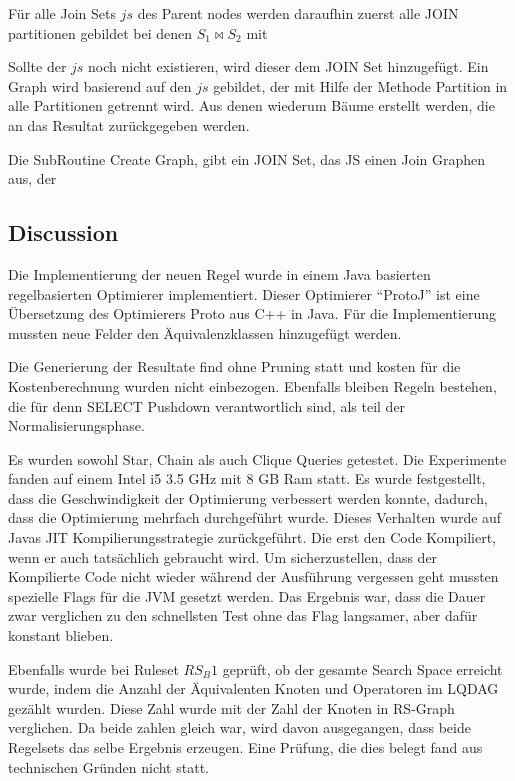 Für alle Join Sets $js$ des Parent nodes werden daraufhin zuerst alle JOIN partitionen gebildet bei denen $S_1 \Join S_2$ mit 

Sollte der $js$ noch nicht existieren, wird dieser dem JOIN Set hinzugefügt. Ein Graph wird basierend auf den $js$ gebildet, der mit Hilfe der Methode Partition in alle Partitionen getrennt wird. Aus denen wiederum Bäume erstellt werden, die an das Resultat zurückgegeben werden.

Die SubRoutine Create Graph, gibt ein JOIN Set, das JS einen Join Graphen aus, der




\subsection{Discussion}
Die Implementierung der neuen Regel wurde in einem Java basierten regelbasierten Optimierer implementiert. Dieser Optimierer “ProtoJ” ist eine Übersetzung des Optimierers Proto aus C++ in Java. Für die Implementierung mussten neue Felder den Äquivalenzklassen hinzugefügt werden.

Die Generierung der Resultate find ohne Pruning statt und kosten für die Kostenberechnung wurden nicht einbezogen. Ebenfalls bleiben Regeln bestehen, die für denn SELECT Pushdown verantwortlich sind, als teil der Normalisierungsphase. 

Es wurden sowohl Star, Chain als auch Clique Queries getestet. Die Experimente fanden auf einem Intel i5 3.5 GHz mit 8 GB Ram statt. Es wurde festgestellt, dass die Geschwindigkeit der Optimierung verbessert werden konnte, dadurch, dass die Optimierung mehrfach durchgeführt wurde. Dieses Verhalten wurde auf Javas JIT Kompilierungsstrategie zurückgeführt. Die erst den Code Kompiliert, wenn er auch tatsächlich gebraucht wird. Um sicherzustellen, dass der Kompilierte Code nicht wieder während der Ausführung vergessen geht mussten spezielle Flags für die JVM gesetzt werden. Das Ergebnis war, dass die Dauer zwar verglichen zu den schnellsten Test ohne das Flag langsamer, aber dafür konstant blieben.

Ebenfalls wurde bei Ruleset $RS_B1$ geprüft, ob der gesamte Search Space erreicht wurde, indem die Anzahl der Äquivalenten Knoten und Operatoren im LQDAG gezählt wurden. Diese Zahl wurde mit der Zahl der Knoten in RS-Graph verglichen. Da beide zahlen gleich war, wird davon ausgegangen, dass beide Regelsets das selbe Ergebnis erzeugen. Eine Prüfung, die dies belegt fand aus technischen Gründen nicht statt.






